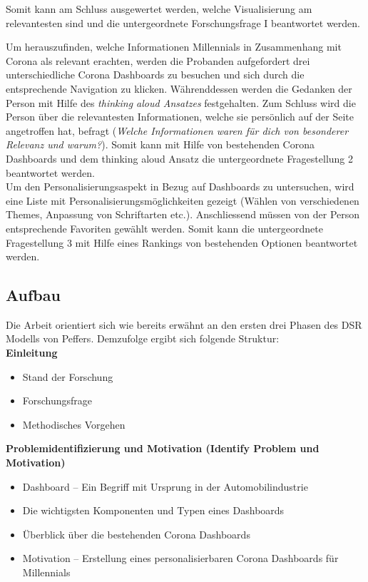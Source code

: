 \documentclass[12pt, oneside]{article}
\begin{document}
Somit kann am Schluss ausgewertet werden, welche Visualisierung am relevantesten sind und die untergeordnete Forschungsfrage I beantwortet werden.

Um herauszufinden, welche Informationen Millennials in Zusammenhang mit Corona als relevant erachten, werden die Probanden aufgefordert drei unterschiedliche Corona Dashboards zu besuchen und sich durch die entsprechende Navigation zu klicken. Währenddessen werden die Gedanken der Person mit Hilfe des \textit{thinking aloud Ansatzes} festgehalten. Zum Schluss wird die Person über die relevantesten Informationen, welche sie persönlich auf der Seite angetroffen hat, befragt (\textit{Welche Informationen waren für dich von besonderer Relevanz und warum?}). Somit kann mit Hilfe von bestehenden Corona Dashboards und dem thinking aloud Ansatz die untergeordnete Fragestellung 2 beantwortet werden.\\

Um den Personalisierungsaspekt in Bezug auf Dashboards zu untersuchen, wird eine Liste mit Personalisierungsmöglichkeiten gezeigt (Wählen von verschiedenen Themes, Anpassung von Schriftarten etc.). Anschliessend müssen von der Person entsprechende Favoriten gewählt werden. Somit kann die untergeordnete Fragestellung 3 mit Hilfe eines Rankings von bestehenden Optionen beantwortet werden.

\clearpage
\subsection{Aufbau}
Die Arbeit orientiert sich wie bereits erwähnt an den ersten drei Phasen des DSR Modells von Peffers. Demzufolge ergibt sich folgende Struktur:\\

\textbf{Einleitung}
\begin{itemize}
    \item Stand der Forschung
    \item Forschungsfrage
    \item Methodisches Vorgehen\\
\end{itemize}


\textbf{Problemidentifizierung und Motivation (Identify Problem und Motivation)}
\begin{itemize}
    \item Dashboard – Ein Begriff mit Ursprung in der Automobilindustrie
    \item Die wichtigsten Komponenten und Typen eines Dashboards
    \item Überblick über die bestehenden Corona Dashboards
    \item Motivation – Erstellung eines personalisierbaren Corona Dashboards für Millennials\\
\end{itemize}
\end{document}
